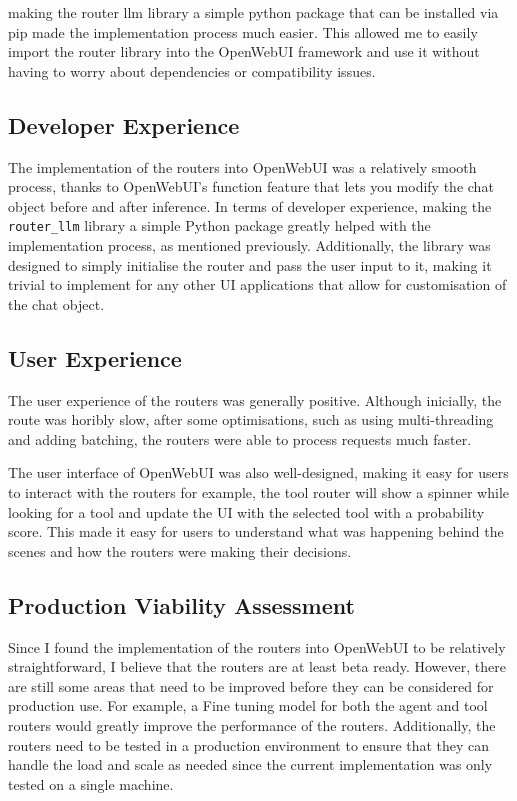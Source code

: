 making the router llm library a simple python package that can be installed via pip made the implementation process much easier. This allowed me to easily import the router library into the OpenWebUI framework and use it without having to worry about dependencies or compatibility issues.

\subsection{Developer Experience}
\label{sec:results-developer-experience}
The implementation of the routers into OpenWebUI was a relatively smooth process, thanks to OpenWebUI's function feature that lets you modify the chat object before and after inference. In terms of developer experience, making the \texttt{router\_llm} library a simple Python package greatly helped with the implementation process, as mentioned previously. Additionally, the library was designed to simply initialise the router and pass the user input to it, making it trivial to implement for any other UI applications that allow for customisation of the chat object.


\subsection{User Experience}
\label{sec:results-user-experience}

The user experience of the routers was generally positive. Although inicially, the route was horibly slow, after some optimisations, such as using multi-threading and adding batching, the routers were able to process requests much faster.

The user interface of OpenWebUI was also well-designed, making it easy for users to interact with the routers for example, the tool router will show a spinner while looking for a tool and update the UI with the selected tool with a probability score. This made it easy for users to understand what was happening behind the scenes and how the routers were making their decisions.

\subsection{Production Viability Assessment}
\label{sec:results-production-viability}

Since I found the implementation of the routers into OpenWebUI to be relatively straightforward, I believe that the routers are at least beta ready. However, there are still some areas that need to be improved before they can be considered for production use. For example, a Fine tuning model for both the agent and tool routers would greatly improve the performance of the routers. Additionally, the routers need to be tested in a production environment to ensure that they can handle the load and scale as needed since the current implementation was only tested on a single machine.

